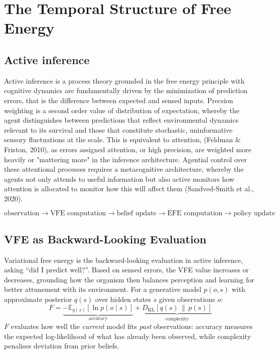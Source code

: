 \documentclass[11pt,a4paper]{article}
\newcommand{\rr}{\color{red!70!black}}
\begin{document}
\section{The Temporal Structure of Free Energy}\label{sec:temporal_structure}


\subsection{Active inference}

{\rr Active inference is a process theory grounded in the free energy principle with cognitive dynamics are fundamentally driven by the minimization of prediction errors, that is the difference between expected and sensed inputs.
Precsion weighting is a second order value of distribution of expectation, whereby the agent distinguishes between predictions that reflect environmental dynamics relevant to its survival and those that constitute stochastic, uninformative sensory fluctuations at the scale. This is equivalent to attention, (Feldman \& Friston, 2010), as errors assigned attention, or high precision, are weighted more heavily or "mattering more" in the inference architecture.
Agential control over these attentional processes requires a metacognitive architecture, whereby the agents not only attends to useful information but also active monitors how attention is allocated to monitor how this will affect them (Sandved-Smith et al., 2020). 





\begin{equation}
    \text{observation} \to {\text{VFE computation}} \to {\text{belief update}} \to {\text{EFE computation}} \to {\text{policy update}}
\end{equation}


}


\subsection{VFE as Backward-Looking Evaluation}\label{sec:vfe}





Variational free energy is the backward-looking evaluation in active inference, {\rr asking ``did I predict well?''. Based on sensed errors, the VFE value increases or decreases, grounding how the organism then balances perception and learning for better attunement with its environment.} For a generative model $p(o, s)$ with approximate posterior $q(s)$ over hidden states $s$ given observations $o$:
\begin{equation}
    F = \underbrace{-\mathbb{E}_{q(s)}[\ln p(o \mid s)]}_{\text{accuracy}} + \underbrace{D_{\mathrm{KL}}[q(s) \,\|\, p(s)]}_{\text{complexity}}
\end{equation}
$F$ evaluates how well the \emph{current} model fits \emph{past} observations: accuracy measures the expected log-likelihood of what has already been observed, while complexity penalises deviation from prior beliefs. 
\end{document}
